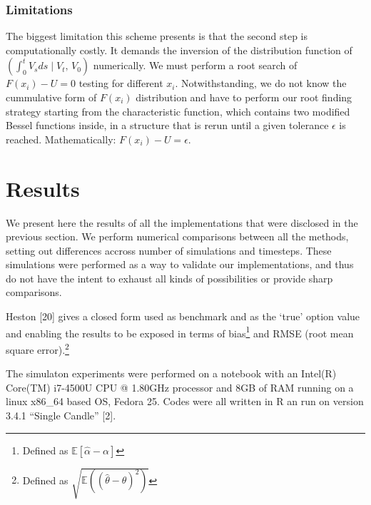 \documentclass[12pt,twoside]{reedthesis}
\theoremstyle{definition}
\theoremstyle{definition}
\theoremstyle{remark}
\begin{document}
  \subsection{Limitations}\label{limitations-1}
  
  The biggest limitation this scheme presents is that the second step is
  computationally costly. It demands the inversion of the distribution
  function of
  \(\left( \displaystyle \int_0^t V_sds \mid V_t, \, V_0 \right)\)
  numerically. We must perform a root search of \(F(x_i) - U = 0\) testing
  for different \(x_i\). Notwithstanding, we do not know the cummulative
  form of \(F(x_i)\) distribution and have to perform our root finding
  strategy starting from the characteristic function, which contains two
  modified Bessel functions inside, in a structure that is rerun until a
  given tolerance \(\epsilon\) is reached. Mathematically:
  \(F(x_i) - U = \epsilon\).
  
  \chapter{Results}\label{resultados}
  
  We present here the results of all the implementations that were
  disclosed in the previous section. We perform numerical comparisons
  between all the methods, setting out differences accross number of
  simulations and timesteps. These simulations were performed as a way to
  validate our implementations, and thus do not have the intent to exhaust
  all kinds of possibilities or provide sharp comparisons.
  
  Heston {[}20{]} gives a closed form used as benchmark and as the `true'
  option value and enabling the results to be exposed in terms of
  bias\footnote{Defined as
    \(\mathbb{E} \left[ \hat{\alpha} - \alpha \right]\)} and RMSE (root
  mean square error).\footnote{Defined as
    \(\sqrt{\mathbb{E}((\hat{\theta}-\theta)^2)}\)}
  
  The simulaton experiments were performed on a notebook with an Intel(R)
  Core(TM) i7-4500U CPU @ 1.80GHz processor and 8GB of RAM running on a
  linux x86\_64 based OS, Fedora 25. Codes were all written in R an run on
  version 3.4.1 ``Single Candle'' {[}2{]}.
  
\end{document}
